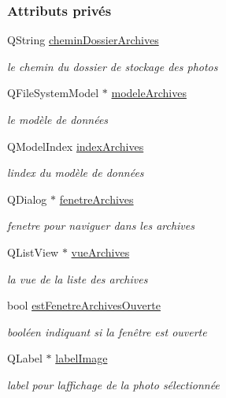 \subsubsection*{Attributs privés}
\begin{DoxyCompactItemize}
\item 
Q\+String \hyperlink{class_archives_af155e5062883030cddaa05623a34854b}{chemin\+Dossier\+Archives}
\begin{DoxyCompactList}\small\item\em le chemin du dossier de stockage des photos \end{DoxyCompactList}\item 
Q\+File\+System\+Model $\ast$ \hyperlink{class_archives_a61376e4ec330aea053fede230a1bc786}{modele\+Archives}
\begin{DoxyCompactList}\small\item\em le modèle de données \end{DoxyCompactList}\item 
Q\+Model\+Index \hyperlink{class_archives_a31cba52f3979585ee5e2b9390d21322b}{index\+Archives}
\begin{DoxyCompactList}\small\item\em l\textquotesingle{}index du modèle de données \end{DoxyCompactList}\item 
Q\+Dialog $\ast$ \hyperlink{class_archives_ad7c8209637b01f638b64530020d18b8e}{fenetre\+Archives}
\begin{DoxyCompactList}\small\item\em fenetre pour naviguer dans les archives \end{DoxyCompactList}\item 
Q\+List\+View $\ast$ \hyperlink{class_archives_a28fe566dcac396079d064460b17293b9}{vue\+Archives}
\begin{DoxyCompactList}\small\item\em la vue de la liste des archives \end{DoxyCompactList}\item 
bool \hyperlink{class_archives_a2b268dd292da50166988ad698af2b0fd}{est\+Fenetre\+Archives\+Ouverte}
\begin{DoxyCompactList}\small\item\em booléen indiquant si la fenêtre est ouverte \end{DoxyCompactList}\item 
Q\+Label $\ast$ \hyperlink{class_archives_af311679d957985d956a4ee5ad28a5988}{label\+Image}
\begin{DoxyCompactList}\small\item\em label pour l\textquotesingle{}affichage de la photo sélectionnée \end{DoxyCompactList}\item 

\end{DoxyCompactItemize}
